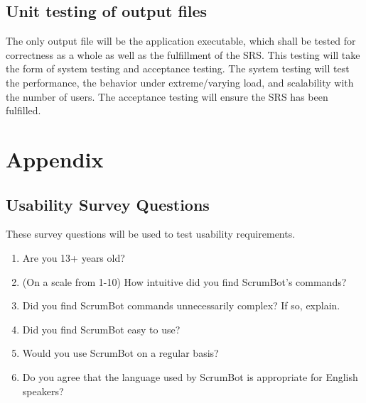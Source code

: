 \documentclass[12pt, titlepage]{article}
\begin{document}
\subsection{Unit testing of output files}		
The only output file will be the application executable, which shall be tested for correctness as a whole as well as the fulfillment of the SRS. This testing will take the form of system testing and acceptance testing. The system testing will test the performance, the behavior under extreme/varying load, and scalability with the number of users. The acceptance testing will ensure the SRS has been fulfilled.



\newpage

\section{Appendix}


\subsection{Usability Survey Questions}
These survey questions will be used to test usability requirements.
\begin{enumerate}
    \item Are you 13+ years old?
    \item (On a scale from 1-10) How intuitive did you find ScrumBot's commands?
    \item Did you find ScrumBot commands unnecessarily complex? If so, explain.
    \item Did you find ScrumBot easy to use?
    \item Would you use ScrumBot on a regular basis?
    \item Do you agree that the language used by ScrumBot is appropriate for English speakers?
\end{enumerate}
\end{document}
